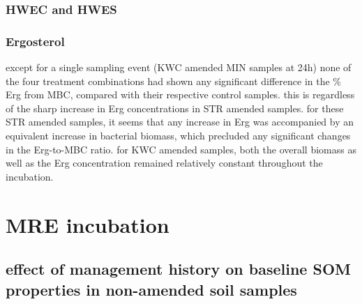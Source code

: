 \documentclass[12pt]{report}
\begin{document}
\subsubsection{HWEC and HWES}


\subsubsection{Ergosterol}

except for a single sampling event (KWC amended MIN samples at 24h) none of the four treatment combinations had shown any significant difference in the \% Erg from MBC, compared with their respective control samples. this is regardless of the sharp increase in Erg concentrations in STR amended samples. for these STR amended samples, it seems that any increase in Erg was accompanied by an equivalent increase in bacterial biomass, which precluded any significant changes in the Erg-to-MBC ratio. for KWC amended samples, both the overall biomass as well as the Erg concentration remained relatively constant throughout the incubation. \\



\section{MRE incubation}

\subsection{effect of management history on baseline SOM properties in non-amended soil samples}
\end{document}
